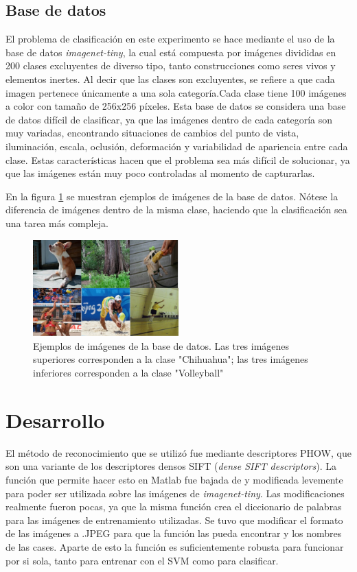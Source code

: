 \documentclass[10pt,twocolumn,letterpaper]{article}
\begin{document}
\subsection{Base de datos \cite{vedaldi08vlfeat}} 
El problema de clasificación en este experimento se hace mediante el uso de la base de datos \textit{imagenet-tiny}, la cual está compuesta por imágenes divididas en 200 clases excluyentes de diverso tipo, tanto construcciones como seres vivos y elementos inertes. Al decir que las clases son excluyentes, se refiere a que cada imagen pertenece únicamente a una sola categoría.Cada clase tiene 100 imágenes a color con tamaño de 256x256 píxeles. Esta base de datos se considera una base de datos difícil de clasificar, ya que las imágenes dentro de cada categoría son muy variadas, encontrando situaciones de cambios del punto de vista, iluminación, escala, oclusión, deformación y variabilidad de apariencia entre cada clase. Estas características hacen que el problema sea más difícil de solucionar, ya que las imágenes están muy poco controladas al momento de capturarlas.

En la figura \ref{fig:ejemplos base de datos} se muestran ejemplos de imágenes de la base de datos. Nótese la diferencia de imágenes dentro de la misma clase, haciendo que la clasificación sea una tarea más compleja.

\begin{figure}[h]
    \centering
    \includegraphics[width=0.5\textwidth]{EjemplosBaseDeDatos.jpg}
    \caption{Ejemplos de imágenes de la base de datos. Las tres imágenes superiores corresponden a la clase "Chihuahua"; las tres imágenes inferiores corresponden a la clase "Volleyball"}
    \label{fig:ejemplos base de datos}
\end{figure}

\section{Desarrollo}
El método de reconocimiento que se utilizó fue mediante descriptores PHOW, que son una variante de los descriptores densos SIFT (\textit{dense SIFT descriptors}). La función que permite hacer esto en Matlab fue bajada de \cite{vedaldi08vlfeat} y modificada levemente para poder ser utilizada sobre las imágenes de \textit{imagenet-tiny}. Las modificaciones realmente fueron pocas, ya que la misma función crea el diccionario de palabras para las imágenes de entrenamiento utilizadas. Se tuvo que modificar el formato de las imágenes a .JPEG para que la función las pueda encontrar y los nombres de las cases. Aparte de esto la función es suficientemente robusta para funcionar por si sola, tanto para entrenar con el SVM como para clasificar.
\end{document}
